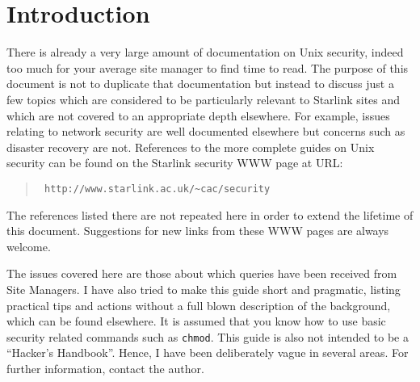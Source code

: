 \documentclass[11pt]{article}
\newcommand{\stardocinitials}  {SSN}
\newcommand{\stardocnumber}    {37.1}
\newcommand{\stardocname}{\stardocinitials /\stardocnumber}
\newcommand{\htmladdnormallink}[2]{#1}
\newenvironment{latexonly}{}{}
\newcommand{\xlabel}[1]{}
\renewcommand{\thepage}{\roman{page}}
\begin{document}
\begin{latexonly}
   \setlength{\parskip}{0mm}
   \tableofcontents
   \setlength{\parskip}{\medskipamount}
   \markright{\stardocname}
\end{latexonly}
\newpage
\renewcommand{\thepage}{\arabic{page}}

\section{\label{introduction}\xlabel{introduction}Introduction} 

There is already a very large amount of documentation on Unix security,
indeed too much for your average site manager to find time to read. The
purpose of this document is not to duplicate that documentation but
instead to discuss just a few topics which are considered to be
particularly relevant to Starlink sites and which are not covered to an
appropriate depth elsewhere. For example, issues relating to network
security are well documented elsewhere but concerns such as disaster
recovery are not. References to the more complete guides on Unix
security can be found on the Starlink security WWW page at URL:

\begin{quote}{\tt
\htmladdnormallink{http://www.starlink.ac.uk/\~{}cac/security}
{http://www.starlink.ac.uk/\~{}cac/security}}
\end{quote}

The references listed there are not repeated here in order to extend the
lifetime of this document. Suggestions for new links from these WWW pages
are always welcome.

The issues covered here are those about which queries have been
received from Site Managers. I have also tried to make this guide short
and pragmatic, listing practical tips and actions without a full blown
description of the background, which can be found elsewhere. It is
assumed that you know how to use basic security related commands such
as {\tt chmod}. This guide is also not intended to be a ``Hacker's
Handbook''. Hence, I have been deliberately vague in several
areas. For further information, contact the author.
\end{document}
